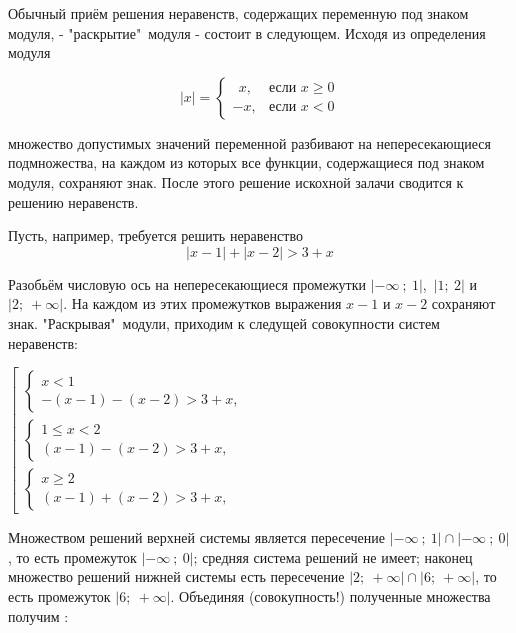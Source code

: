 Обычный приём решения неравенств, содержащих переменную под знаком модуля, - "раскрытие"\ модуля - состоит в следующем. Исходя из определения модуля

\[ |x| =
  \begin{cases}
    \ \ x,  &  \text{если } x \geq 0\\
    -x,     &  \text{если } x < 0
  \end{cases}
\]

\noindent множество допустимых значений переменной разбивают на непересекающиеся подмножества, на каждом из которых все функции, содержащиеся под знаком модуля, сохраняют знак.
После этого решение искохной залачи сводится к решению  неравенств.

Пусть, например, требуется решить неравенство 
\[|x-1| + |x-2| > 3+x\]

\noindent Разобьём числовую ось на непересекающиеся промежутки $|-\infty\ ;\ 1|$,\ $|1;\ 2|$ и $|2;\ +\infty|$. На каждом из этих промежутков выражения $x-1$ и $x-2$ сохраняют знак. "Раскрывая"\ модули, приходим к следущей совокупности систем неравенств:



\begin{center}

$\left[ 
  \begin{gathered}
    \begin{cases}
        x<1\\
        -(x-1)-(x-2) > 3 + x,
    \end{cases}
    \\
    \begin{cases}
        1\leq x<2\\
        (x-1)-(x-2) > 3 + x,
    \end{cases}
    \\
    \begin{cases}
        x\geq2\\
        (x-1)+(x-2) > 3 + x,
    \end{cases}
  \end{gathered}
\right.$
\end{center}

Множеством решений верхней системы является пересечение $|-\infty\ ;\ 1|\cap|-\infty\ ;\ 0|$, то есть промежуток $|-\infty\ ;\ 0|$; средняя система решений не имеет; наконец множество решений нижней системы есть пересечение $|2;\ +\infty|\cap|6;\ +\infty|$, то есть промежуток $|6;\ +\infty|$. Объединяя (совокупность!) полученные множества получим :

